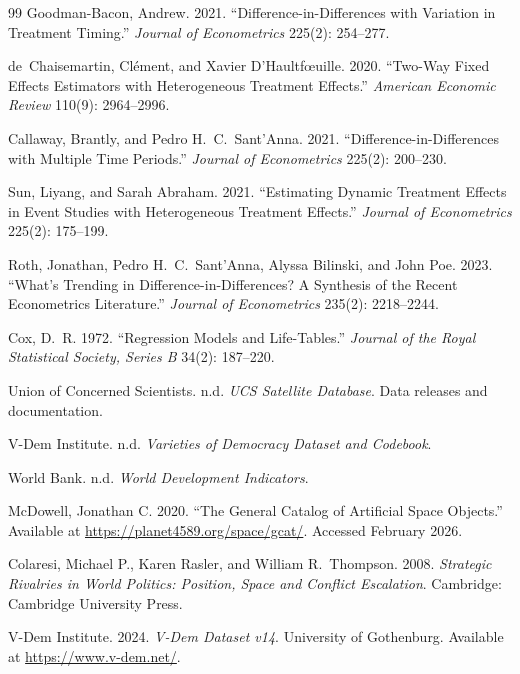 \documentclass[11pt]{article}
\begin{document}
\begin{thebibliography}{99}
Goodman-Bacon, Andrew. 2021.
``Difference-in-Differences with Variation in Treatment Timing.''
\textit{Journal of Econometrics} 225(2): 254--277.

de~Chaisemartin, Cl\'{e}ment, and Xavier D'Haultf\oe uille. 2020.
``Two-Way Fixed Effects Estimators with Heterogeneous Treatment Effects.''
\textit{American Economic Review} 110(9): 2964--2996.

Callaway, Brantly, and Pedro H.\ C.\ Sant'Anna. 2021.
``Difference-in-Differences with Multiple Time Periods.''
\textit{Journal of Econometrics} 225(2): 200--230.

Sun, Liyang, and Sarah Abraham. 2021.
``Estimating Dynamic Treatment Effects in Event Studies with Heterogeneous Treatment Effects.''
\textit{Journal of Econometrics} 225(2): 175--199.

Roth, Jonathan, Pedro H.\ C.\ Sant'Anna, Alyssa Bilinski, and John Poe. 2023.
``What's Trending in Difference-in-Differences? A Synthesis of the Recent Econometrics Literature.''
\textit{Journal of Econometrics} 235(2): 2218--2244.

Cox, D.\ R. 1972.
``Regression Models and Life-Tables.''
\textit{Journal of the Royal Statistical Society, Series B} 34(2): 187--220.

Union of Concerned Scientists. n.d.
\textit{UCS Satellite Database}.
Data releases and documentation.

V-Dem Institute. n.d.
\textit{Varieties of Democracy Dataset and Codebook}.

World Bank. n.d.
\textit{World Development Indicators}.

McDowell, Jonathan C. 2020.
``The General Catalog of Artificial Space Objects.''
Available at \url{https://planet4589.org/space/gcat/}.
Accessed February 2026.

Colaresi, Michael P., Karen Rasler, and William R.\ Thompson. 2008.
\textit{Strategic Rivalries in World Politics: Position, Space and Conflict Escalation}.
Cambridge: Cambridge University Press.

V-Dem Institute. 2024.
\textit{V-Dem Dataset v14}.
University of Gothenburg.
Available at \url{https://www.v-dem.net/}.


\end{thebibliography}
\end{document}
